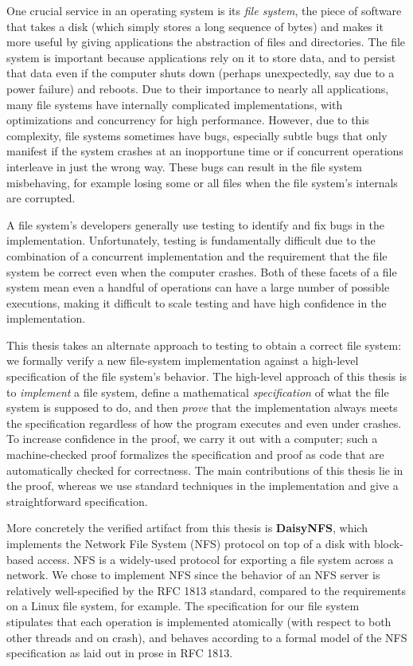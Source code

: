 One crucial service in an operating system is its \emph{file system}, the piece
of software that takes a disk (which simply stores a long sequence of bytes) and
makes it more useful by giving applications the abstraction of files and directories. The file
system is important because applications rely on it to store data, and to
persist that data even if the computer shuts down (perhaps unexpectedly, say due
to a power failure) and reboots. Due to their importance to nearly all applications, many
file systems have internally complicated implementations, with optimizations and
concurrency for high performance. However, due to this complexity, file systems
sometimes have bugs, especially subtle bugs that only manifest if the system
crashes at an inopportune time or if concurrent operations interleave in just
the wrong way. These bugs can result in the file system misbehaving, for example
losing some or all files when the file system's internals are corrupted.

A file system's developers generally use testing to identify and fix bugs in the
implementation. Unfortunately, testing is fundamentally difficult due to the
combination of a concurrent implementation and the requirement that the file
system be correct even when the computer crashes. Both of these facets of a file
system mean even a handful of operations can have a large number of possible
executions, making it difficult to scale testing and have high confidence in the
implementation.

This thesis takes an alternate approach to testing to obtain a correct file
system: we formally verify a new file-system implementation against a high-level
specification of the file system's behavior. The high-level approach of this
thesis is to \emph{implement} a file system, define a mathematical
\emph{specification} of what the file system is supposed to do, and then
\emph{prove} that the implementation always meets the specification regardless
of how the program executes and even under crashes. To increase confidence in
the proof, we carry it out with a computer; such a machine-checked proof
formalizes the specification and proof as code that are automatically checked
for correctness. The main contributions of this thesis lie in the proof, whereas
we use standard techniques in the implementation and give a straightforward
specification.

More concretely the verified
artifact from this thesis is \textbf{DaisyNFS}, which implements the Network
File System (NFS) protocol on top of a disk with block-based access. NFS is a
widely-used protocol for exporting a file system across a network. We chose to
implement NFS since the behavior of an NFS server is relatively well-specified
by the RFC 1813 standard, compared to the requirements on a Linux file system,
for example. The specification for our file system stipulates that each
operation is implemented atomically (with respect to both other threads and on
crash), and behaves according to a formal model of the NFS specification as laid
out in prose in RFC 1813.

